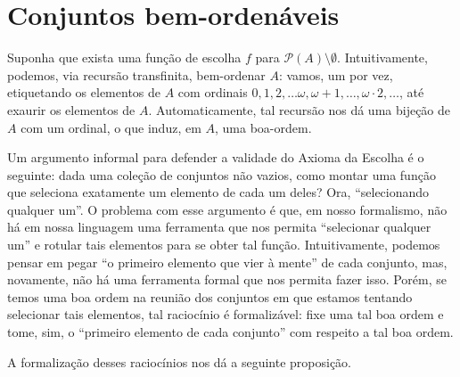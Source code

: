 \section{Conjuntos bem-ordenáveis}\label{sec:bemOrdenaveis}
Suponha que exista uma função de escolha $f$ para $\mathcal P(A)\setminus{\emptyset}$.
Intuitivamente, podemos, via recursão transfinita, bem-ordenar $A$:
vamos, um por vez, etiquetando os elementos de $A$ com ordinais $0, 1, 2, \dots \omega, \omega+1, \dots, \omega\cdot 2, \dots$, até exaurir os elementos de $A$.
Automaticamente, tal recursão nos dá uma bijeção de $A$ com um ordinal, o que induz, em $A$, uma boa-ordem.

Um argumento informal para defender a validade do Axioma da Escolha é o seguinte: dada uma coleção de conjuntos não vazios, como montar uma função que seleciona exatamente um elemento de cada um deles?
Ora, ``selecionando qualquer um''.
O problema com esse argumento é que, em nosso formalismo, não há em nossa linguagem uma ferramenta que nos permita ``selecionar qualquer um'' e rotular tais elementos para se obter tal função.
Intuitivamente, podemos pensar em pegar ``o primeiro elemento que vier à mente'' de cada conjunto, mas, novamente, não há uma ferramenta formal que nos permita fazer isso.
Porém, se temos uma boa ordem na reunião dos conjuntos em que estamos tentando selecionar tais elementos, tal raciocínio é formalizável: fixe uma tal boa ordem e tome, sim, o ``primeiro elemento de cada conjunto'' com respeito a tal boa ordem.

A formalização desses raciocínios nos dá a seguinte proposição.

